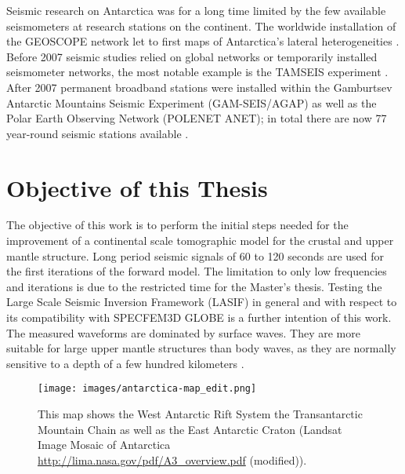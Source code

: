 Seismic research on Antarctica was for a long time limited by the few available seismometers at research stations on the continent. 
The worldwide installation of the GEOSCOPE network let to first maps of Antarctica's lateral heterogeneities \citep{Roult1994}.
Before 2007 seismic studies relied on global networks or temporarily installed seismometer networks, the most notable
example is the TAMSEIS experiment \citep{Lawrence2006}. 
After 2007 permanent broadband stations were installed within the Gamburtsev Antarctic Mountains Seismic Experiment (GAM-SEIS/AGAP)
as well as the Polar Earth Observing Network (POLENET ANET); 
in total there are now 77 year-round seismic stations available \citep{Anthony2014}.  


\section{Objective of this Thesis} %

The objective of this work is to perform the initial steps needed for the improvement of a continental scale tomographic model for the crustal and upper mantle structure.
Long period seismic signals of 60 to 120 seconds %
are used for the first iterations of the forward model. 
The limitation to only low frequencies and %
iterations is due to the restricted time for the Master's thesis.
Testing the Large Scale Seismic Inversion Framework (LASIF) in general and with respect to its compatibility with SPECFEM3D 
GLOBE is a further intention of this work.
The measured waveforms are dominated by surface waves. 
They are more suitable for large upper mantle structures than body waves, as they are normally sensitive to a depth of a few 
hundred kilometers \citep{Morelli2004}.

 


\begin{figure}[H]
\begin{center}
\texttt{[image: images/antarctica-map\_edit.png]}
\caption{This map shows the West Antarctic Rift System the Transantarctic Mountain Chain as well as the East Antarctic Craton 
(Landsat Image Mosaic of Antarctica \url{http://lima.nasa.gov/pdf/A3_overview.pdf} (modified)).}
\label{ant-map}
\end{center}
\end{figure}